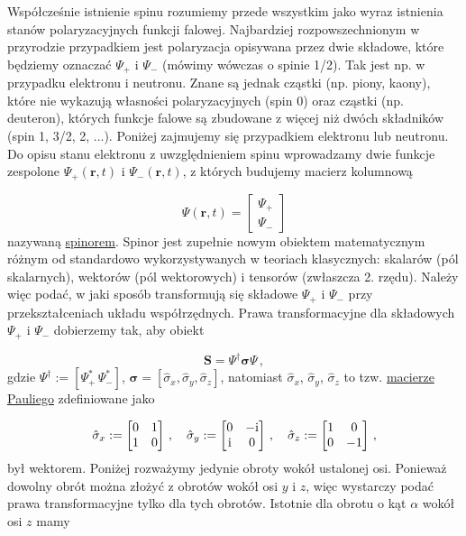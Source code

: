 \documentclass{myclass}
\begin{document}
Współcześnie istnienie spinu rozumiemy przede wszystkim jako wyraz istnienia stanów polaryzacyjnych
funkcji falowej. Najbardziej rozpowszechnionym w przyrodzie przypadkiem jest polaryzacja opisywana
przez dwie składowe, które będziemy oznaczać \(\Psi_+\) i \(\Psi_-\) (mówimy wówczas o spinie 1/2).
Tak jest np. w przypadku elektronu i neutronu. Znane są jednak cząstki (np. piony, kaony), które nie
wykazują własności polaryzacyjnych (spin 0) oraz cząstki (np. deuteron), których funkcje falowe są
zbudowane z więcej niż dwóch składników (spin 1, 3/2, 2, ...). Poniżej zajmujemy się przypadkiem
elektronu lub neutronu.\\

Do opisu stanu elektronu z uwzględnieniem spinu wprowadzamy dwie funkcje zespolone
\(\Psi_+(\mathbf{r},t)\) i \(\Psi_-(\mathbf{r},t)\), z których budujemy macierz kolumnową

\begin{equation*}
\mathsf{\Psi}(\mathbf{r},t)=\begin{bmatrix}
\Psi_+\\
\Psi_-
\end{bmatrix}
\end{equation*}
nazywaną \underline{spinorem}. Spinor jest zupełnie nowym obiektem matematycznym różnym od
standardowo wykorzystywanych w teoriach klasycznych: skalarów (pól skalarnych), wektorów (pól
wektorowych) i tensorów (zwłaszcza 2. rzędu). Należy więc podać, w jaki sposób transformują się
składowe \(\Psi_+\) i \(\Psi_-\) przy przekształceniach układu współrzędnych. Prawa transformacyjne
dla składowych \(\Psi_+\) i \(\Psi_-\) dobierzemy tak, aby obiekt

\begin{equation*}
\mathbf{S} = \mathsf{\Psi}^\dagger\boldsymbol{\sigma}\mathsf{\Psi}\,,    
\end{equation*}
gdzie \(\mathsf{\Psi}^\dagger := [\Psi_+^*\,\Psi_-^*]\),
\(\boldsymbol{\sigma}=[\hat{\sigma}_x,\hat{\sigma}_y,\hat{\sigma}_z]\), natomiast
\(\hat{\sigma}_x\), \(\hat{\sigma}_y\), \(\hat{\sigma}_z\) to tzw. \underline{macierze Pauliego}
zdefiniowane jako

\begin{equation*}
\hat{\sigma}_x:=\begin{bmatrix}
0 & 1\\
1 & 0
\end{bmatrix}\,,\quad 
\hat{\sigma}_y:=\begin{bmatrix}
0 & -\mathrm{i}\\
\mathrm{i} & 0
\end{bmatrix}\,,\quad 
\hat{\sigma}_z:=\begin{bmatrix}
1 & 0\\
0 & -1
\end{bmatrix}\,,
\end{equation*}
był wektorem. Poniżej rozważymy jedynie obroty wokół ustalonej osi. Ponieważ dowolny obrót można
złożyć z obrotów wokół osi \(y\) i \(z\), więc wystarczy podać prawa transformacyjne tylko dla tych
obrotów. Istotnie dla obrotu o kąt \(\alpha\) wokół osi \(z\) mamy
\end{document}
